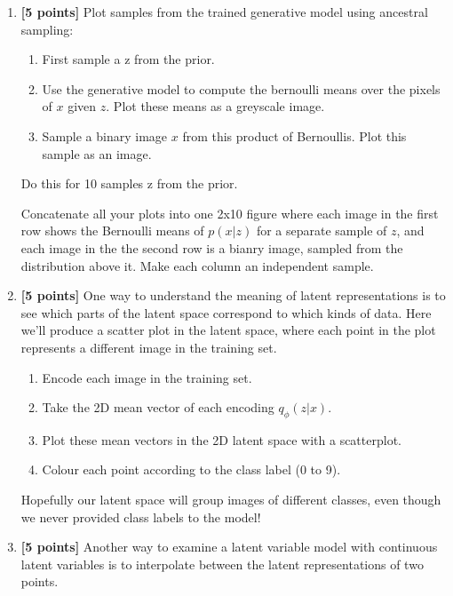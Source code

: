 \documentclass{article}
\begin{document}
\begin{enumerate}[label=(\alph*)]
	\item {\bf [5 points]} Plot samples from the trained generative model using ancestral sampling:	
	\begin{enumerate}[label=(\alph*)]

			\item First sample a z from the prior.
			\item Use the generative model to compute the bernoulli means over the pixels of $x$ given $z$. Plot these means as a greyscale image.
			\item Sample a binary image $x$ from this product of Bernoullis. Plot this sample as an image.
	\end{enumerate}
	Do this for 10 samples z from the prior.
	
	Concatenate all your plots into one 2x10 figure where each image in the first row shows the Bernoulli means of $p(x|z)$ for a separate sample of $z$, and each image in the the second row is a bianry image, sampled from the distribution above it.
	Make each column an independent sample.
	
	\item {\bf [5 points]} One way to understand the meaning of latent representations is to see which parts of the latent space correspond to which kinds of data.
	Here we'll produce a scatter plot in the latent space, where each point in the plot represents a different image in the training set.
	
	\begin{enumerate}[label=(\alph*)]
		\item Encode each image in the training set.
		\item Take the 2D mean vector of each encoding $q_\phi(z|x)$.
		\item Plot these mean vectors in the 2D latent space with a scatterplot.
		\item Colour each point according to the class label (0 to 9).
	\end{enumerate}
	
	Hopefully our latent space will group images of different classes, even though we never provided class labels to the model!

	\item {\bf [5 points]} Another way to examine a latent variable model with continuous latent variables is to interpolate between the latent representations of two points.
	

\end{enumerate}
\end{document}
